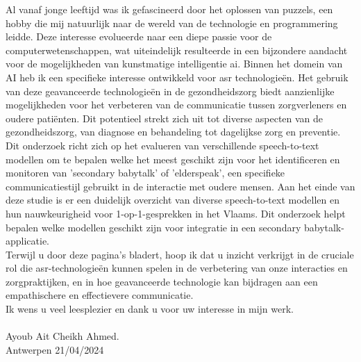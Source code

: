 Al vanaf jonge leeftijd was ik gefascineerd door het oplossen van puzzels, een hobby die mij natuurlijk naar de wereld van de technologie en programmering leidde. Deze interesse evolueerde naar een diepe passie voor de computerwetenschappen, wat uiteindelijk resulteerde in een bijzondere aandacht voor de mogelijkheden van kunstmatige intelligentie \gls{ai}. Binnen het domein van AI heb ik een specifieke interesse ontwikkeld voor \gls{asr} technologieën. Het gebruik van deze geavanceerde technologieën in de gezondheidszorg biedt aanzienlijke mogelijkheden voor het verbeteren van de communicatie tussen zorgverleners en oudere patiënten. Dit potentieel strekt zich uit tot diverse aspecten van de gezondheidszorg, van diagnose en behandeling tot dagelijkse zorg en preventie.
\\
Dit onderzoek richt zich op het evalueren van verschillende speech-to-text modellen om te bepalen welke het meest geschikt zijn voor het identificeren en monitoren van 'secondary babytalk' of 'elderspeak', een specifieke communicatiestijl gebruikt in de interactie met oudere mensen. Aan het einde van deze studie is er een duidelijk overzicht van diverse speech-to-text modellen en hun nauwkeurigheid voor 1-op-1-gesprekken in het Vlaams. Dit onderzoek helpt bepalen welke modellen geschikt zijn voor integratie in een secondary babytalk-applicatie.
\\
Terwijl u door deze pagina's bladert, hoop ik dat u inzicht verkrijgt in de cruciale rol die \gls{asr}-technologieën kunnen spelen in de verbetering van onze interacties en zorgpraktijken, en in hoe geavanceerde technologie kan bijdragen aan een empathischere en effectievere communicatie.
\\
Ik wens u veel leesplezier en dank u voor uw interesse in mijn werk.
\\
\\
Ayoub Ait Cheikh Ahmed.
\\
Antwerpen 21/04/2024